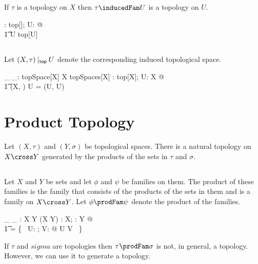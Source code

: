 \documentclass{amsart}
\begin{document}
\begin{remark}
If $\tau$ is a topology on $X$ then $\tau \inducedFam U$ is a topology on $U$.

\begin{zed}
	\forall \tau: top[\setX]; U: \power \setX @ \\
	\t1	\tau \inducedFam U \in top[U]
\end{zed}

\end{remark}

\subsection{}

Let $(X, \tau) \mathbin{|_{\mathsf{top}}} U$ denote the corresponding induced topological space.

\begin{gendef}[X]
	\_ \inducedTopSp \_: topSpace[X] \cross \power X \fun topSpaces[X]
\where
	\forall \tau: top[X]; U: \power X @ \\
	\t1	(X, \tau) \inducedTopSp U = (U, \tau \inducedFam U)
\end{gendef}

\section{Product Topology}

Let $(X, \tau)$ and $(Y, \sigma) $ be topological spaces.
There is a natural topology on $X \cross Y$ generated by the products of the sets in $\tau$ and $\sigma$.

\subsection{}

Let $X$ and $Y$ be sets and let $\phi$ and $\psi$ be families on them.
The product of these families is the family that consists of the products of the sets in them and is a family on $X \cross Y$.
Let $\phi \prodFam \psi$ denote the product of the families.

\begin{gendef}[X,Y]
	\_ \prodFam \_ : \Fam X \cross \Fam Y \fun \Fam(X \cross Y)
\where
	\forall \phi: \Fam X; \psi: \Fam Y @ \\
	\t1	\phi \prodFam \psi = \{~ U: \phi; V: \psi @ U \cross V ~\}
\end{gendef}

\begin{remark}

If $\tau$ and $sigma$ are topologies then $\tau \prodFam \sigma$ is not, in general, a topology.
However, we can use it to generate a topology.

\end{remark}
\end{document}
